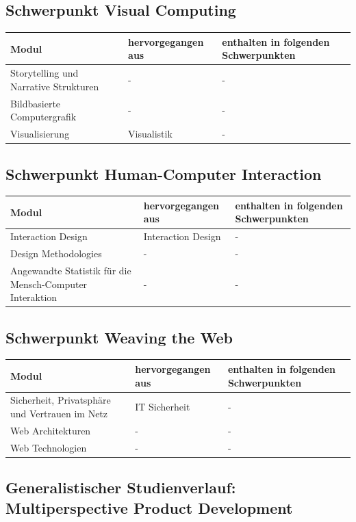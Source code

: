 \subsection{Schwerpunkt Visual
Computing}\label{schwerpunkt-visual-computing}

\begin{longtable}[]{@{}lll@{}}
\toprule
Modul & hervorgegangen aus & enthalten in folgenden
Schwerpunkten\tabularnewline
\midrule
\endhead
Storytelling und Narrative Strukturen & - & -\tabularnewline
Bildbasierte Computergrafik & - & -\tabularnewline
Visualisierung & Visualistik & -\tabularnewline
\bottomrule
\end{longtable}

\subsection{Schwerpunkt Human-Computer
Interaction}\label{schwerpunkt-human-computer-interaction}

\begin{longtable}[]{@{}lll@{}}
\toprule
Modul & hervorgegangen aus & enthalten in folgenden
Schwerpunkten\tabularnewline
\midrule
\endhead
Interaction Design & Interaction Design & -\tabularnewline
Design Methodologies & - & -\tabularnewline
Angewandte Statistik für die Mensch-Computer Interaktion & - &
-\tabularnewline
\bottomrule
\end{longtable}

\subsection{Schwerpunkt Weaving the
Web}\label{schwerpunkt-weaving-the-web}

\begin{longtable}[]{@{}lll@{}}
\toprule
Modul & hervorgegangen aus & enthalten in folgenden
Schwerpunkten\tabularnewline
\midrule
\endhead
Sicherheit, Privatsphäre und Vertrauen im Netz & IT Sicherheit &
-\tabularnewline
Web Architekturen & - & -\tabularnewline
Web Technologien & - & -\tabularnewline
\bottomrule
\end{longtable}

\subsection{Generalistischer Studienverlauf: Multiperspective Product
Development}\label{generalistischer-studienverlauf-multiperspective-product-development}

